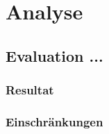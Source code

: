 
\section{Analyse}
\label{Analyse}


\subsection{Evaluation ...}
\label{Analyse:Evaluation ...}


\subsubsection{Resultat}
\label{Analyse:Resulat}



\subsubsection{Einschränkungen}
\label{Analyse:Einschränkungen}

